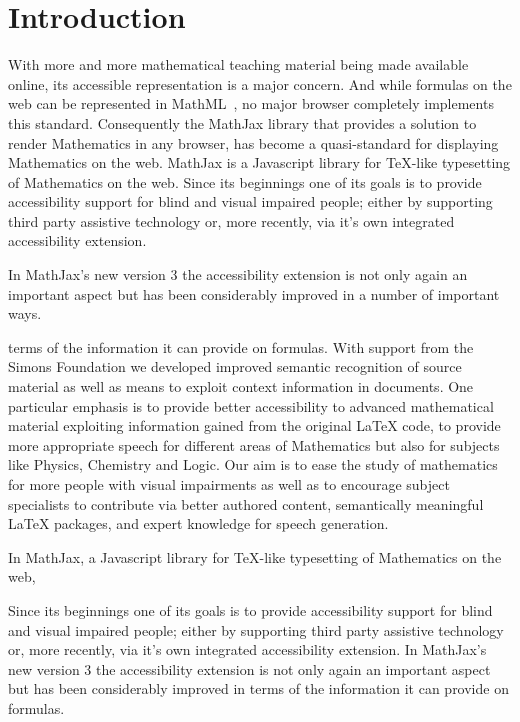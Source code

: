 \documentclass{sig-alternate}
\begin{document}


\enlargethispage{10pt}
\section{Introduction}

With more and more mathematical teaching material being made available online,
its accessible representation is a major concern. And while formulas on the web
can be represented in MathML~\cite{MathML3}, no major browser completely
implements this standard. Consequently the MathJax library that provides a
solution to render Mathematics in any browser, has become a quasi-standard for
displaying Mathematics on the web.  MathJax is a Javascript library for TeX-like
typesetting of Mathematics on the web. Since its beginnings one of its goals is
to provide accessibility support for blind and visual impaired people; either by
supporting third party assistive technology or, more recently, via it's own
integrated accessibility extension.

In MathJax's new version 3 the accessibility extension is not only again an
important aspect but has been considerably improved in a number of important
ways.


terms of the information
it can provide on formulas. With support from the Simons Foundation we developed
improved semantic recognition of source material as well as means to exploit
context information in documents. One particular emphasis is to provide better
accessibility to advanced mathematical material exploiting information gained
from the original LaTeX code, to provide more appropriate speech for different
areas of Mathematics but also for subjects like Physics, Chemistry and Logic.
Our aim is to ease the study of mathematics for more people with visual
impairments as well as to encourage subject specialists to contribute via better
authored content, semantically meaningful LaTeX packages, and expert knowledge
for speech generation.


  In MathJax, a Javascript library for TeX-like typesetting of Mathematics on the
  web,

  Since its beginnings one of its goals is to provide accessibility support for
  blind and visual impaired people; either by supporting third party assistive
  technology or, more recently, via it's own integrated accessibility extension.
In MathJax's new version 3 the accessibility extension is not only again an
important aspect but has been considerably improved in terms of the information
it can provide on formulas.
\end{document}
